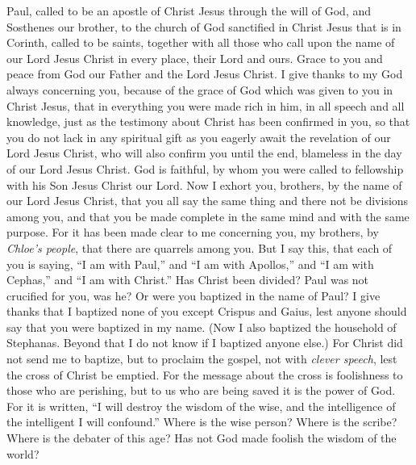 
\begin{biblechapter} %
 Paul, called to be an apostle of Christ Jesus through the will of God, and Sosthenes our brother,
\verse to the church of God sanctified in Christ Jesus that is in Corinth, called to be saints, together with all those who call upon the name of our Lord Jesus Christ in every place, their Lord and ours.
\verse Grace to you and peace from God our Father and the Lord Jesus Christ.
 I give thanks to my God always concerning you, because of the grace of God which was given to you in Christ Jesus,
\verse that in everything you were made rich in him, in all speech and all knowledge,
\verse just as the testimony about Christ has been confirmed in you,
\verse so that you do not lack in any spiritual gift as you eagerly await the revelation of our Lord Jesus Christ,
\verse who will also confirm you until the end, blameless in the day of our Lord Jesus Christ.
\verse God is faithful, by whom you were called to fellowship with his Son Jesus Christ our Lord.
 Now I exhort you, brothers, by the name of our Lord Jesus Christ, that you all say the same thing and there not be divisions among you, and that you be made complete in the same mind and with the same purpose.
\verse For it has been made clear to me concerning you, my brothers, by \textit{Chloe’s people}, that there are quarrels among you.
\verse But I say this, that each of you is saying, “I am with Paul,” and “I am with Apollos,” and “I am with Cephas,” and “I am with Christ.”
\verse Has Christ been divided? Paul was not crucified for you, was he? Or were you baptized in the name of Paul?
\verse I give thanks that I baptized none of you except Crispus and Gaius,
\verse lest anyone should say that you were baptized in my name.
\verse (Now I also baptized the household of Stephanas. Beyond that I do not know if I baptized anyone else.)
\verse For Christ did not send me to baptize, but to proclaim the gospel, not with \textit{clever speech}, lest the cross of Christ be emptied.
 For the message about the cross is foolishness to those who are perishing, but to us who are being saved it is the power of God.
\verse For it is written, “I will destroy the wisdom of the wise, 
and the intelligence of the intelligent I will confound.”
\verse Where is the wise person? Where is the scribe? Where is the debater of this age? Has not God made foolish the wisdom of the world?

\end{biblechapter}

